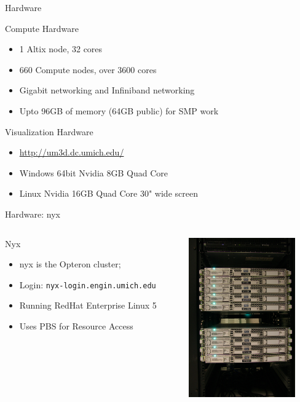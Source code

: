 \documentclass[handout]{beamer}
\begin{document}
  \begin{frame}{Hardware}
   \begin{block}{Compute Hardware}
    \begin{itemize}
    \item 1 Altix node, 32 cores
    \item 660 Compute nodes, over 3600 cores
    \item Gigabit networking and Infiniband networking
    \item Upto 96GB of memory (64GB public) for SMP work
    \end{itemize}
   \end{block}
   \begin{block}{Visualization Hardware}
    \begin{itemize}
     \item \url{http://um3d.dc.umich.edu/}
     \item Windows 64bit Nvidia 8GB Quad Core
     \item Linux Nvidia 16GB Quad Core 30" wide screen
    \end{itemize}
   \end{block}
  \end{frame}
  \begin{frame}{Hardware: nyx}
   \begin{columns}[c]
   \begin{column}{7cm}
    \begin{block}{Nyx}
    \begin{itemize}
    \item nyx is the Opteron cluster;
    \item Login: \texttt{nyx-login.engin.umich.edu}
    \item Running RedHat Enterprise Linux 5
    \item Uses PBS for Resource Access
    \end{itemize}
   \end{block}
   \end{column}
   \begin{column}{5cm}
    \begin{center}\includegraphics[height=2.7in]{nyx}\end{center}
   \end{column}
  \end{columns}
  \end{frame}
\end{document}
